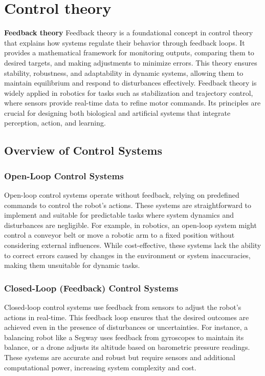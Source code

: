 \chapter{Control theory}
\textbf{Feedback theory}
Feedback theory is a foundational concept in control theory that explains how systems regulate their behavior through feedback loops. It provides a mathematical framework for monitoring outputs, comparing them to desired targets, and making adjustments to minimize errors. This theory ensures stability, robustness, and adaptability in dynamic systems, allowing them to maintain equilibrium and respond to disturbances effectively. Feedback theory is widely applied in robotics for tasks such as stabilization and trajectory control, where sensors provide real-time data to refine motor commands. Its principles are crucial for designing both biological and artificial systems that integrate perception, action, and learning.  


\section{Overview of Control Systems}

\subsection{Open-Loop Control Systems}
Open-loop control systems operate without feedback, relying on predefined commands to control the robot's actions. These systems are straightforward to implement and suitable for predictable tasks where system dynamics and disturbances are negligible. For example, in robotics, an open-loop system might control a conveyor belt or move a robotic arm to a fixed position without considering external influences. While cost-effective, these systems lack the ability to correct errors caused by changes in the environment or system inaccuracies, making them unsuitable for dynamic tasks.

\subsection{Closed-Loop (Feedback) Control Systems}
Closed-loop control systems use feedback from sensors to adjust the robot's actions in real-time. This feedback loop ensures that the desired outcomes are achieved even in the presence of disturbances or uncertainties. For instance, a balancing robot like a Segway uses feedback from gyroscopes to maintain its balance, or a drone adjusts its altitude based on barometric pressure readings. These systems are accurate and robust but require sensors and additional computational power, increasing system complexity and cost.

